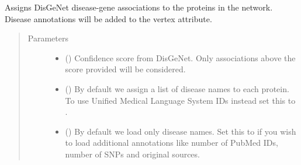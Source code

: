 \documentclass[letterpaper,10pt,english]{sphinxmanual}
\begin{document}
\begin{fulllineitems}

\begin{fulllineitems}
\label{\detokenize{reference:pypath.main.PyPath.load_depod_dmi}}
\end{fulllineitems}


\begin{fulllineitems}
\label{\detokenize{reference:pypath.main.PyPath.load_disgenet}}
Assigns DisGeNet disease-gene associations to the proteins
in the network. Disease annotations will be added to the 
vertex attribute.
\begin{quote}\begin{description}
\item[{Parameters}] \leavevmode\begin{itemize}
\item {} 
 () \textendash{} Confidence score from DisGeNet. Only associations
above the score provided will be considered.

\item {} 
 () \textendash{} By default we assign a list of disease names to
each protein. To use Unified Medical Language System IDs instead
set this to .

\item {} 
 () \textendash{} By default we load only disease names. Set this
to  if you wish to load additional annotations like number
of PubMed IDs, number of SNPs and original sources.

\end{itemize}

\end{description}\end{quote}


\end{fulllineitems}
\end{fulllineitems}
\end{document}
